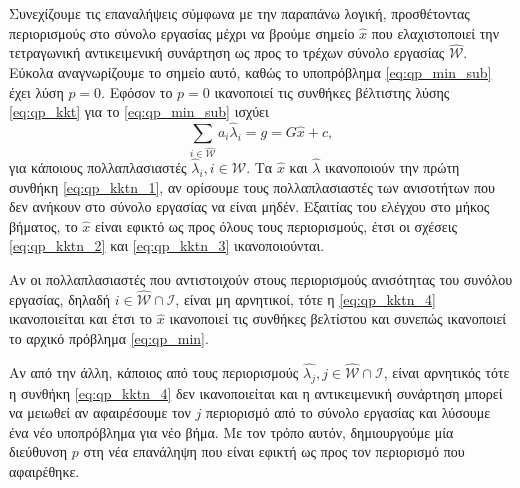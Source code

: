 Συνεχίζουμε τις επαναλήψεις σύμφωνα με την παραπάνω λογική, προσθέτοντας
περιορισμούς στο σύνολο εργασίας μέχρι να βρούμε σημείο $\hat{x}$ που
ελαχιστοποιεί την τετραγωνική αντικειμενική συνάρτηση ως προς το τρέχων σύνολο
εργασίας $\mathcal{\hat{W}}$. Εύκολα αναγνωρίζουμε το σημείο αυτό, καθώς το
υποπρόβλημα \eqref{eq:qp_min_sub} έχει λύση $p = 0$. Εφόσον το $p = 0$
ικανοποιεί τις συνθήκες βέλτιστης λύσης \eqref{eq:qp_kkt} για το
\eqref{eq:qp_min_sub} ισχύει
\begin{equation}\label{eq:qp_1642}
    \sum_{i\in \mathcal{\hat{W}}} a_i \hat{\lambda}_i = g = G\hat{x} + c,
\end{equation}
για κάποιους πολλαπλασιαστές  $\hat{\lambda}_i, i \in
\mathcal{\hat{W}}$. Τα $\hat{x}$ και $\hat{\lambda}$ ικανοποιούν την πρώτη
συνθήκη  \eqref{eq:qp_kktn_1}, αν ορίσουμε τους πολλαπλασιαστές των
ανισοτήτων που δεν ανήκουν στο σύνολο εργασίας να είναι μηδέν. Εξαιτίας του
ελέγχου στο μήκος βήματος, το $\hat{x}$ είναι εφικτό ως προς όλους τους
περιορισμούς, έτσι οι σχέσεις \eqref{eq:qp_kktn_2} και \eqref{eq:qp_kktn_3}
ικανοποιούνται.

Αν οι πολλαπλασιαστές που αντιστοιχούν στους περιορισμούς ανισότητας του συνόλου
εργασίας, δηλαδή $i \in \mathcal{\hat{W}}\cap \mathcal{I}$, είναι μη αρνητικοί,
τότε η \eqref{eq:qp_kktn_4} ικανοποιείται και έτσι το $\hat{x}$ ικανοποιεί τις
συνθήκες βελτίστου και συνεπώς ικανοποιεί το αρχικό πρόβλημα
\eqref{eq:qp_min}.

Αν από την άλλη, κάποιος από τους περιορισμούς $\hat{\lambda_j}, j \in
\mathcal{\hat{W}}\cap \mathcal{I}$, είναι αρνητικός τότε η συνθήκη
\eqref{eq:qp_kktn_4} δεν ικανοποιείται και η αντικειμενική συνάρτηση μπορεί να
μειωθεί αν αφαιρέσουμε τον $j$ περιορισμό από το σύνολο εργασίας και λύσουμε ένα
νέο υποπρόβλημα για νέο βήμα. Με τον τρόπο αυτόν, δημιουργούμε μία διεύθυνση
$p$ στη νέα επανάληψη που είναι εφικτή ως προς τον περιορισμό που αφαιρέθηκε.

